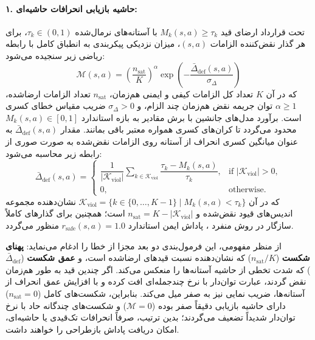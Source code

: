 \documentclass[oneside,openany,phd]{TMU-Thesis}
\begin{document}
\paragraph{۱. حاشیه بازیابی انحرافات حاشیه‌ای:}
تحت قرارداد ارضای قید $M_k(s, a) \ge \tau_k$ با آستانه‌های نرمال‌شده $\tau_k \in (0, 1)$، برای هر گذار نقض‌کننده الزامات $(s, a)$، میزان نزدیکی پیکربندی به انطباق کامل با رابطه ریاضی زیر سنجیده می‌شود:
\begin{equation}
\label{eq:recoverability_margin}
\mathcal{M}(s, a) = \left( \frac{n_{\text{sat}}}{K} \right)^\alpha \exp\left( - \frac{\bar{\Delta}_{\text{def}}(s, a)}{\sigma_\Delta} \right)
\end{equation}
که در آن $K$ تعداد کل الزامات کیفی و ایمنی هم‌زمان، $n_{\text{sat}}$ تعداد الزامات ارضاشده، $\alpha \ge 1$ توان جریمه نقض هم‌زمان چند الزام، و $\sigma_\Delta > 0$ ضریب مقیاس خطای کسری است. برآورد مدل‌های جانشین با برش مقادیر به بازه استاندارد $M_k(s, a) \in [0, 1]$ محدود می‌گردد تا کران‌های کسری همواره معتبر باقی بمانند. مقدار $\bar{\Delta}_{\text{def}}(s, a)$ به عنوان میانگین کسری انحراف از آستانه روی الزامات نقض‌شده به صورت صوری از رابطه زیر محاسبه می‌شود:
\begin{equation}
\label{eq:delta_def_formula}
\bar{\Delta}_{\text{def}}(s, a) = \begin{cases}
\dfrac{1}{|\mathcal{K}_{\text{viol}}|} \displaystyle\sum_{k \in \mathcal{K}_{\text{viol}}} \dfrac{\tau_k - M_k(s, a)}{\tau_k}, & \text{if } |\mathcal{K}_{\text{viol}}| > 0, \\[8pt]
0, & \text{otherwise}.
\end{cases}
\end{equation}
که در آن $\mathcal{K}_{\text{viol}} = \{k \in \{0, \dots, K-1\} \mid M_k(s, a) < \tau_k\}$ نشان‌دهنده مجموعه اندیس‌های قیود نقض‌شده و $n_{\text{sat}} = K - |\mathcal{K}_{\text{viol}}|$ است؛ همچنین برای گذارهای کاملاً سازگار در روش منفرد \mursdrl، پاداش ایمن استاندارد $r_{\text{safe}}(s, a) = 1.0$ منظور می‌گردد.

از منظر مفهومی، این فرمول‌بندی دو بعد مجزا از خطا را ادغام می‌نماید: \textbf{پهنای شکست} ($n_{\text{sat}}/K$) که نشان‌دهنده نسبت قیدهای ارضاشده است، و \textbf{عمق شکست} ($\bar{\Delta}_{\text{def}}$) که شدت تخطی از حاشیه آستانه‌ها را منعکس می‌کند. اگر چندین قید به طور هم‌زمان نقض گردند، عبارت توان‌دار با نرخ چندجمله‌ای افت کرده و با افزایش عمق انحراف از آستانه‌ها، ضریب نمایی نیز به صفر میل می‌کند. بنابراین، شکست‌های کامل ($n_{\text{sat}}=0$) دارای حاشیه بازیابی دقیقاً صفر بوده ($\mathcal{M}=0$) و شکست‌های چندگانه حاد با نرخ توان‌دار شدیداً تضعیف می‌گردند؛ بدین ترتیب، صرفاً انحرافات تک‌قیدی یا حاشیه‌ای، امکان دریافت پاداش بازطراحی را خواهند داشت.
\end{document}
